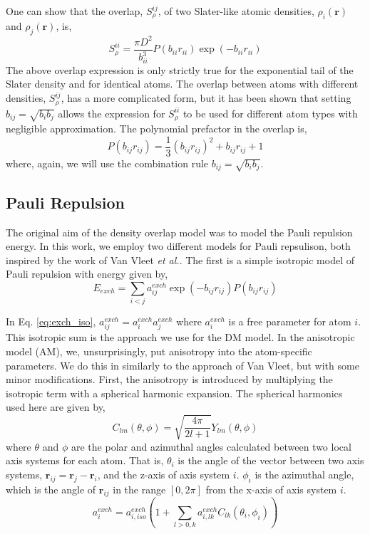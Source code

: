 \documentclass[journal=jacsat,manuscript=article]{achemso}
\begin{document}
One can show that the overlap, $S^{ij}_\rho$, of two Slater-like atomic densities,
$\rho_i(\mathbf{r})$ and $\rho_j(\mathbf{r})$, is,
\begin{equation}
  S^{ii}_\rho=\frac{\pi D^2}{b_{ii}^3}P(b_{ii}r_{ii})\exp(-b_{ii}r_{ii})
\end{equation}
The above overlap expression is only strictly true for the exponential tail
of the Slater density and for identical atoms. The overlap between atoms
with different densities, $S^{ij}_\rho$, has a more complicated form, but
it has been shown that setting $b_{ij}=\sqrt{b_ib_j}$ allows the expression
for $S^{ii}_\rho$ to be used for different atom types with negligible
approximation\cite{van2016beyond}. The polynomial prefactor in the overlap is,
\begin{equation}
  P(b_{ij}r_{ij})=\frac13(b_{ij}r_{ij})^2 + b_{ij}r_{ij}+1
\end{equation}
where, again, we will use the combination rule $b_{ij}=\sqrt{b_ib_j}$.

\subsection*{Pauli Repulsion}
The original aim of the density overlap model was to model the
Pauli repulsion energy.\cite{wwallqvist1989new,wheatley1990overlap,gordon1996approximate}
In this work, we employ two different models for Pauli repsulison,
both inspired by the work of Van Vleet \textit{et al.}\cite{van2016beyond,van2018new}.
The first is a simple isotropic model of Pauli repulsion with energy given by,
\begin{equation}
  E_{exch} = \sum_{i<j}a_{ij}^{exch}\exp(-b_{ij}r_{ij})P(b_{ij}r_{ij})
  \label{eq:exch_iso}
\end{equation}

In Eq. \ref*{eq:exch_iso}, $a_{ij}^{exch}=a_{i}^{exch}a_{j}^{exch}$ where
$a_{i}^{exch}$ is a free parameter for atom $i$. This isotropic sum is the
approach we use for the DM model. In the anisotropic model (AM), we,
unsurprisingly, put anisotropy into the atom-specific parameters.
We do this in similarly to the approach of Van Vleet, but with some minor
modifications\cite{van2018new}. First, the anisotropy is introduced by multiplying
the isotropic term with a spherical harmonic expansion. The spherical harmonics
used here are given by,
\begin{equation}
  C_{lm}(\theta,\phi)=\sqrt{\frac{4\pi}{2l+1}}Y_{lm}(\theta,\phi)
\end{equation}
where $\theta$ and $\phi$ are the polar and azimuthal angles
calculated between two local axis systems for each atom.\cite{bernardo1994anisotropic}
That is, $\theta_i$ is the angle of the vector between two axis systems,
$\mathbf{r}_{ij}=\mathbf{r}_j-\mathbf{r}_i$, and the z-axis of axis system $i$.
$\phi_i$ is the azimuthal angle, which is the angle of $\mathbf{r}_{ij}$ in the range $[0,2\pi]$ from the
x-axis of axis system $i$.
\begin{equation}
  a_i^{exch} = a_{i,iso}^{exch}\left(1 + \sum_{l>0,k}a_{i,lk}^{exch}C_{lk}(\theta_i,\phi_i)\right)
  \label{eq:exch_params_aniso}
\end{equation}
\end{document}
